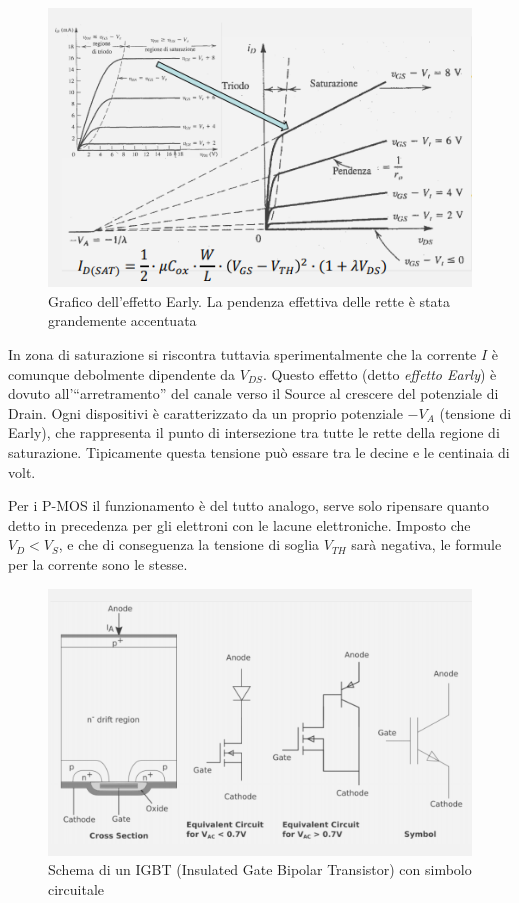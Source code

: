 \documentclass{article}
\begin{document}
\begin{figure}[h]
  \centering
  \includegraphics[scale=0.85]{IM_Effetto_Early}
  \caption{Grafico dell'effetto Early. La pendenza effettiva delle rette è stata grandemente accentuata}
  \label{Schema_Effetto_Early}
\end{figure}

In zona di saturazione si riscontra tuttavia sperimentalmente che la corrente $I$ è comunque debolmente dipendente da $V_{DS}$. Questo effetto (detto \textit{effetto Early}) è dovuto all'``arretramento'' del canale verso il Source al crescere del potenziale di Drain. Ogni dispositivi è caratterizzato da un proprio potenziale $-V_A$ (tensione di Early), che rappresenta il punto di intersezione tra tutte le rette della regione di saturazione. Tipicamente questa tensione può essare tra le decine e le centinaia di volt.

\vspace{3mm}

Per i P-MOS il funzionamento è del tutto analogo, serve solo ripensare quanto detto in precedenza per gli elettroni con le lacune elettroniche. Imposto che $V_D < V_S$, e che di conseguenza la tensione di soglia $V_{TH}$ sarà negativa, le formule per la corrente sono le stesse.

\begin{figure}[h]
  \centering
  \includegraphics[scale=0.65]{IM_IGBT}
  \caption{Schema di un IGBT (Insulated Gate Bipolar Transistor) con simbolo circuitale}
  \label{Schema_IGBT}
\end{figure}
\end{document}
